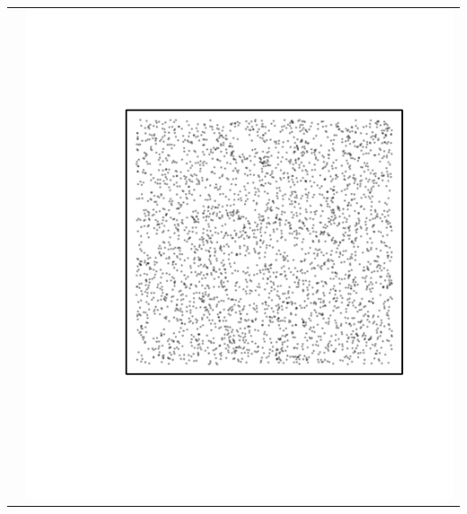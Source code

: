 \documentclass{article}\usepackage{graphicx, color}
\makeatletter
\def\maxwidth{ %
  \ifdim\Gin@nat@width>\linewidth
    \linewidth
  \else
    \Gin@nat@width
  \fi
}
\newenvironment{knitrout}{}{} %
\makeatother
\begin{document}
\begin{tabular}{cc}
&
\begin{knitrout}
\definecolor{shadecolor}{rgb}{0.969, 0.969, 0.969}\color{fgcolor}\includegraphics[width=\maxwidth]{figure/unnamed-chunk-12} 
\end{knitrout}

\\
\end{tabular}
\end{document}
